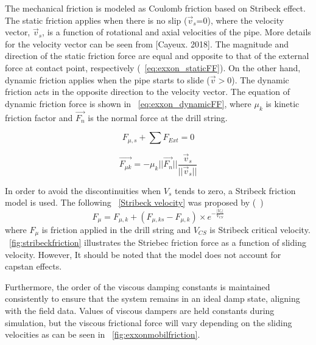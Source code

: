 The mechanical friction is modeled as Coulomb friction based on Stribeck effect. The static friction applies when there is no slip ($\vec{v}_s$=0), where the velocity vector, $\vec{v}_s$, is a function of rotational and axial velocities of the pipe. More details for the velocity vector can be seen from [Cayeux. 2018]. The magnitude and direction of the static friction force are equal and opposite to that of the external force at contact point, respectively (\equationname~\ref{eq:exxon_staticFF}). On the other hand, dynamic friction applies when the pipe starts to slide ($\vec{v} > 0$). The dynamic friction acts in the opposite direction to the velocity vector. The equation of dynamic friction force is shown in \equationname~\ref{eq:exxon_dynamicFF}, where $\mu_k$ is kinetic friction factor and $\vec{F_n}$ is the normal force at the drill string.

\begin{equation}\label{eq:exxon_staticFF}
  F_{\mu,s} + \sum F_{Ext} = 0
\end{equation}

\begin{equation}\label{eq:exxon_dynamicFF}
  \vec{F_{\mu k}} = -\mu_k ||{\vec{F_n}}||\frac{\vec{v}_s}{{||\vec{v}_s}||}
\end{equation}


In order to avoid the discontinuities when $V_s$ tends to zero, a Stribeck friction model is used. The following \equationname~\ref{Stribeck velocity} was proposed by (~\cite{ref:tustin1947a})
\begin{equation}\label{Stribeck velocity}
F_{\mu} = F_{\mu,k} + (F_{\mu,ks} - F_{\mu,k})\times e^{-\frac{|V_s|}{V_{CS}}}
\end{equation}
where $F_{\mu}$ is friction applied in the drill string and $V_{CS}$ is Stribeck critical velocity. \figurename~\ref{fig:stribeckfriction} illustrates the Striebec friction force as a function of sliding velocity. However, It should be noted that the model does not account for capstan effects. 

Furthermore, the order of the viscous damping constants is maintained consistently to ensure that the system remains in an ideal damp state, aligning with the field data. Values of viscous dampers are held constants during simulation, but the viscous frictional force will vary depending on the sliding velocities as can be seen in \figurename~\ref{fig:exxonmobilfriction}. 

